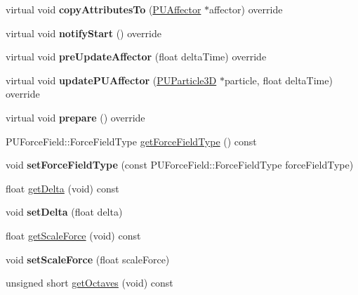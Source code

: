 \begin{DoxyCompactItemize}
virtual void {\bfseries copy\+Attributes\+To} (\hyperlink{classPUAffector}{P\+U\+Affector} $\ast$affector) override
\item 
\mbox{\label{classPUForceFieldAffector_a381e2802b5fa60a07f026639c8e02138}} 
virtual void {\bfseries notify\+Start} () override
\item 
\mbox{\label{classPUForceFieldAffector_aed90c9b29ba6f97c82c4eda8863f6c44}} 
virtual void {\bfseries pre\+Update\+Affector} (float delta\+Time) override
\item 
\mbox{\label{classPUForceFieldAffector_af50e05fdef28d8354445e211a2ccb5bb}} 
virtual void {\bfseries update\+P\+U\+Affector} (\hyperlink{structPUParticle3D}{P\+U\+Particle3D} $\ast$particle, float delta\+Time) override
\item 
\mbox{\label{classPUForceFieldAffector_a7033fdd2541a210004e200c87e6e444a}} 
virtual void {\bfseries prepare} () override
\item 
P\+U\+Force\+Field\+::\+Force\+Field\+Type \hyperlink{classPUForceFieldAffector_a6972445d36658e3b8db5829353924058}{get\+Force\+Field\+Type} () const
\item 
\mbox{\label{classPUForceFieldAffector_a76ff701e22aa954df11bb42185eacc4b}} 
void {\bfseries set\+Force\+Field\+Type} (const P\+U\+Force\+Field\+::\+Force\+Field\+Type force\+Field\+Type)
\item 
float \hyperlink{classPUForceFieldAffector_a0ba6d06fe458c53af34742842a6e4c79}{get\+Delta} (void) const
\item 
\mbox{\label{classPUForceFieldAffector_a0ec85118ac42194edfc575a9992dd994}} 
void {\bfseries set\+Delta} (float delta)
\item 
float \hyperlink{classPUForceFieldAffector_a12af699397b6e69920660b1c6a269d6b}{get\+Scale\+Force} (void) const
\item 
\mbox{\label{classPUForceFieldAffector_a1ace43e77384d03a6bcbac0c7d4f9adf}} 
void {\bfseries set\+Scale\+Force} (float scale\+Force)
\item 
unsigned short \hyperlink{classPUForceFieldAffector_a874e63dfc3673058b6c5a8ad111f6260}{get\+Octaves} (void) const

\end{DoxyCompactItemize}
